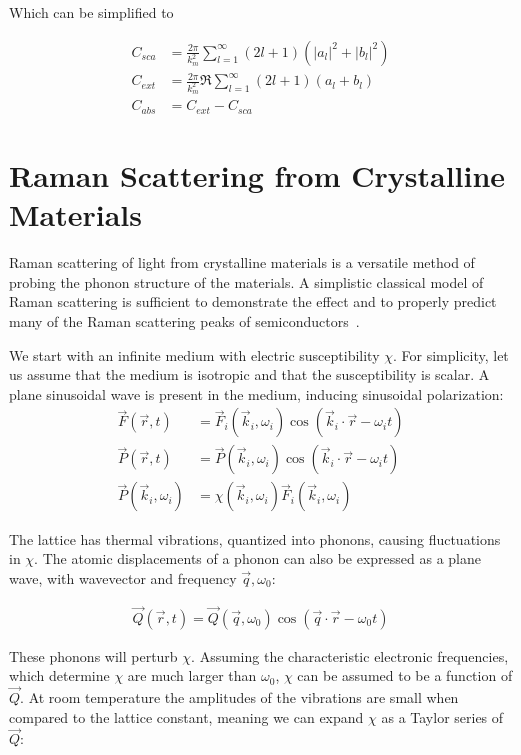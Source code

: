         Which can be simplified to

        \begin{align}
            C_{sca} &= \frac{2\pi}{k^2_m}\sum_{l=1}^\infty (2l +1)(|a_l|^2 + |b_l|^2)\\
            C_{ext} &= \frac{2\pi}{k^2_m}\Re\sum_{l=1}^\infty (2l +1)(a_l + b_l)\\
            C_{abs} &= C_{ext} - C_{sca}
        \end{align}

\clearpage

\section{Raman Scattering from Crystalline Materials}
\label{ap:Raman}
    Raman scattering of light from crystalline materials is a versatile method of probing the phonon structure of the materials.
    A simplistic classical model of Raman scattering is sufficient to demonstrate the effect and to properly predict many of the
    Raman scattering peaks of semiconductors~\cite{peter2010fundamentals}.

    We start with an infinite medium with electric susceptibility $\chi$. For simplicity, let us assume that the medium is isotropic
    and that the susceptibility is scalar. A plane sinusoidal wave is present in the medium, inducing sinusoidal polarization:
    \begin{align}
        \vec{F}(\vec{r}, t) &= \vec{F}_i(\vec{k}_i, \omega_i)\cos(\vec{k}_i\cdot\vec{r} - \omega_i t) \\
        \vec{P}(\vec{r}, t) &= \vec{P}(\vec{k}_i, \omega_i)\cos(\vec{k}_i\cdot\vec{r} - \omega_i t) \\
        \vec{P}(\vec{k}_i, \omega_i) &= \chi(\vec{k}_i, \omega_i)\vec{F}_i(\vec{k}_i, \omega_i)
    \end{align}

    The lattice has thermal vibrations, quantized into phonons, causing fluctuations in $\chi$. The atomic displacements of a phonon
    can also be expressed as a plane wave, with wavevector and frequency $\vec{q}, \omega_0$:

    \begin{align}
        \vec{Q}(\vec{r}, t) = \vec{Q}(\vec{q},\omega_0)\cos(\vec{q}\cdot\vec{r}-\omega_0 t)
    \end{align}

    These phonons will perturb $\chi$. Assuming the characteristic electronic frequencies, which determine $\chi$ are
    much larger than $\omega_0$, $\chi$ can be assumed to be a function of $\vec{Q}$. At room temperature the
    amplitudes of the vibrations are small when compared to the lattice constant, meaning we can expand $\chi$ as
    a Taylor series of $\vec{Q}$:

